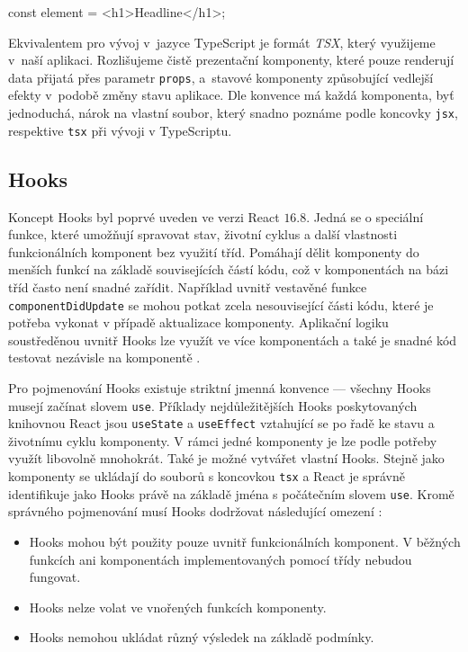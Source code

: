 \begin{code}
const element = <h1>Headline</h1>;
\end{code}

Ekvivalentem pro vývoj v~jazyce TypeScript je formát \emph{TSX}, který využijeme v~naší aplikaci. Rozlišujeme čistě prezentační komponenty, které pouze renderují data přijatá přes parametr \texttt{props}, a~stavové komponenty způsobující vedlejší efekty v~podobě změny stavu aplikace. Dle konvence má každá komponenta, byť jednoduchá, nárok na vlastní soubor, který snadno poznáme podle koncovky \texttt{jsx}, respektive \texttt{tsx} při vývoji v TypeScriptu.

\subsection{Hooks}

Koncept Hooks byl poprvé uveden ve verzi React $16.8$. Jedná se o speciální funkce, které umožňují spravovat stav, životní cyklus a další vlastnosti funkcionálních komponent bez využití tříd. Pomáhají dělit komponenty do menších funkcí na základě souvisejících částí kódu, což v komponentách na bázi tříd často není snadné zařídit. Například uvnitř vestavěné funkce \texttt{componentDidUpdate} se mohou potkat zcela nesouvisející části kódu, které je potřeba vykonat v případě aktualizace komponenty. Aplikační logiku soustředěnou uvnitř Hooks lze využít ve více komponentách a také je snadné kód testovat nezávisle na komponentě \citep{react-hooks}.

Pro pojmenování Hooks existuje striktní jmenná konvence --- všechny Hooks musejí začínat slovem \texttt{use}. Příklady nejdůležitějších Hooks poskytovaných knihovnou React jsou \texttt{useState} a \texttt{useEffect} vztahující se po řadě ke stavu a životnímu cyklu komponenty. V rámci jedné komponenty je lze podle potřeby využít libovolně mnohokrát. Také je možné vytvářet vlastní Hooks. Stejně jako komponenty se ukládají do souborů s koncovkou \texttt{tsx} a React je správně identifikuje jako Hooks právě na základě jména s počátečním slovem \texttt{use}. Kromě správného pojmenování musí Hooks dodržovat následující omezení \citep{react-hooks-w3c}:
\begin{itemize}
    \item Hooks mohou být použity pouze uvnitř funkcionálních komponent. V běžných funkcích ani komponentách implementovaných pomocí třídy nebudou fungovat.
    \item Hooks nelze volat ve vnořených funkcích komponenty.
    \item Hooks nemohou ukládat různý výsledek na základě podmínky.
\end{itemize}
 
